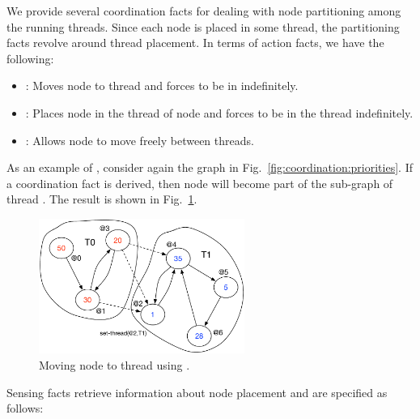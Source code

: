 We provide several coordination facts for dealing with node partitioning among
the running threads. Since each node is placed in some thread, the partitioning
facts revolve around thread placement.  In terms of action facts, we have the
following:

\begin{itemize}
   \item {}: Moves node  to thread
       and forces  to be in  indefinitely.

   \item {}: Places node  in the thread
      of node  and forces  to be in the thread indefinitely.

   \item {}: Allows node  to move freely
   between threads.

\end{itemize}

As an example of , consider again the graph in
Fig.~\ref{fig:coordination:priorities}. If a coordination fact
 is derived, then node  will become part
of the sub-graph of thread . The result is shown in
Fig.~\ref{fig:coordination:partitioning}.

\begin{figure}
\begin{center}
   \includegraphics[width=0.6\textwidth]{figures/coordination/partitioning.pdf}
\end{center}
\caption{Moving node  to thread  using
   .}
\label{fig:coordination:partitioning}
\end{figure}

Sensing facts retrieve information about node placement and are specified as
follows:

